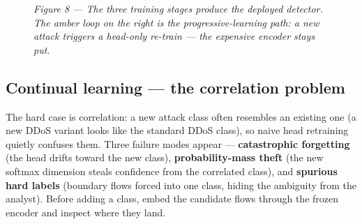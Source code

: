 \documentclass[11pt,a4paper]{article}
\begin{document}
\begin{figure}[H]
\caption*{\small\textit{Figure 8 --- The three training stages produce the deployed detector. The amber loop on the right is the progressive-learning path: a new attack triggers a head-only re-train --- the expensive encoder stays put.}}
\end{figure}

\subsection{Continual learning --- the correlation problem}
The hard case is correlation: a new attack class often resembles an existing one (a new DDoS variant looks like the standard DDoS class), so naive head retraining quietly confuses them. Three failure modes appear --- \textbf{catastrophic forgetting} (the head drifts toward the new class), \textbf{probability-mass theft} (the new softmax dimension steals confidence from the correlated class), and \textbf{spurious hard labels} (boundary flows forced into one class, hiding the ambiguity from the analyst). Before adding a class, embed the candidate flows through the frozen encoder and inspect where they land.
\end{document}
